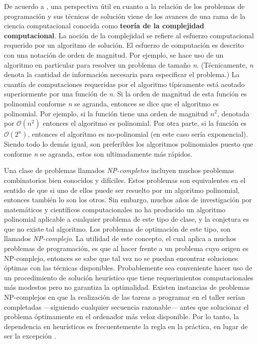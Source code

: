 \documentclass[spanish,draft,12pt,headsepline,footsepline,paper=letter]{scrreprt}
\newcommand{\BigO}{\ensuremath{\mathcal{O}}}%
\begin{document}
De acuerdo a \cite[p.~6]{Baker2009}, una perspectiva útil en cuanto a la relación de los problemas de programación y sus técnicas de solución viene de los avances de una rama de la ciencia computacional conocida como \textbf{teoría de la complejidad computacional}. La noción de la complejidad se refiere al esfuerzo computacional requerido por un algoritmo de solución. El esfuerzo de computación es descrito con una notación de orden de magnitud.
%
Por ejemplo, se hace uso de un algoritmo en particular para resolver un problema de tamaño \textit{n}. (Técnicamente, \textit{n} denota la cantidad de información necesaria para especificar el problema.) La cuantía de computaciones requeridas por el algoritmo típicamente está acotado superiormente por una función de \textit{n}. Si la orden de magnitud de esta función es polinomial conforme \textit{n} se agranda, entonces se dice que el algoritmo es polinomial.
%
Por ejemplo, si la función tiene una orden de magnitud $\textit{n}^2$, denotada por $\BigO(\textit{n}^2)$ entonces el algoritmo es polinomial. Por otra parte, si la función es $\BigO(2^\textit{n})$, entonces el algoritmo es no-polinomial (en este caso sería exponencial). Siendo todo lo demás igual, son preferibles los algoritmos polinomiales puesto que conforme \textit{n} se agranda, estos son ultimadamente más rápidos.

Una clase de problemas llamados \textit{NP-completos} incluyen muchos problemas combinatorios bien conocidos y difíciles. Estos problemas son equivalentes en el sentido de que si uno de ellos puede ser resuelto por un algoritmo polinomial, entonces también lo son los otros. Sin embargo, muchos años de investigación por matemáticos y científicos computacionales no ha producido un algoritmo polinomial aplicable a cualquier problema de este tipo de clase, y la conjetura es que no existe tal algoritmo. Los problemas de optimación de este tipo, son llamados \textit{NP-complejo}. La utilidad de este concepto, el cual aplica a muchos problemas de programación, es que al hacer frente a un problema cuyo origen es NP-complejo, entonces se sabe que tal vez no se puedan encontrar soluciones óptimas con las técnicas disponibles. Probablemente sea conveniente hacer uso de un procedimiento de solución heurístico que tiene requerimientos computacionales más modestos pero no garantiza la optimalidad. Existen instancias de problemas NP-complejos en que la realización de las tareas a programar en el taller serían completadas —siguiendo cualquier secuencia razonable— antes que solucionar el problema óptimamente en el ordenador más veloz disponible. Por lo tanto, la dependencia en heurísticos es frecuentemente la regla en la práctica, en lugar de ser la excepción \citep[p.~6]{Baker2009}.
\end{document}
